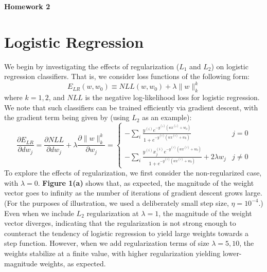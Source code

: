 \documentclass[10pt,psamsfonts]{amsart}
\theoremstyle{definition}
\theoremstyle{remark}
\numberwithin{equation}{section}
\begin{document}
	

\begin{center}
	{\bf Homework 2}
\end{center}

\section{Logistic Regression}

We begin by investigating the effects of regularization ($L_1$ and $L_2$) on logistic regression classifiers. That is, we consider loss functions of the following form:
$$E_{LR}(w, w_0) \equiv NLL(w, w_0) + \lambda\|w\|_k^k$$
where $k = 1, 2$, and $NLL$ is the negative log-likelihood loss for logistic regression. We note that such classifiers can be trained efficiently via gradient descent, with the gradient term being given by (using $L_2$ as an example):
$$\frac{\partial E_{LR}}{\partial dw_j} = \frac{\partial NLL}{\partial dw_j} + \lambda \frac{\partial \|w\|_k^k}{\partial w_j} = \left\{ \begin{matrix} -\sum_i \frac{y^{(i)} e^{-y^{(i)}(wx^{(i)} + w_0)}}{1 + e^{-y^{(i)}(wx^{(i)} + w_0)}} & j =0 \\ -\sum_i \frac{y^{(i)} x^{(i)}_j e^{-y^{(i)}(wx^{(i)} + w_0)}}{1 + e^{-y^{(i)}(wx^{(i)} + w_0)}} + 2\lambda w_j & j \neq 0 \end{matrix}  \right.$$
To explore the effects of regularization, we first consider the non-regularized case, with $\lambda = 0$. {\bf Figure 1(a)} shows that, as expected, the magnitude of the weight vector goes to infinity as the number of iterations of gradient descent grows large. (For the purposes of illustration, we used a deliberately small step size, $\eta = 10^{-4}$.) Even when we include $L_2$ regularization at $\lambda = 1$, the magnitude of the weight vector diverges, indicating that the regularization is not strong enough to counteract the tendency of logistic regression to yield large weights towards a step function. However, when we add regularization terms of size $\lambda = 5, 10$, the weights stabilize at a finite value, with higher regularization yielding lower-magnitude weights, as expected.
\end{document}
